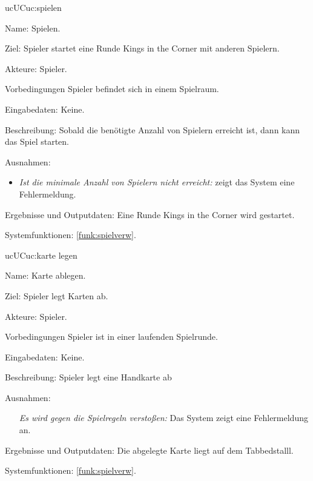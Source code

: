 \begin{description}[leftmargin=5em, style=sameline]
	\begin{lhp}{uc}{UC}{uc:spielen}
		\item [Name:] Spielen.
		\item [Ziel:] Spieler startet eine Runde Kings in the Corner mit anderen Spielern.
		\item [Akteure:] Spieler.
		\item [Vorbedingungen] Spieler befindet sich in einem Spielraum.
		\item [Eingabedaten:] Keine.
		\item [Beschreibung:] Sobald die benötigte Anzahl von Spielern erreicht ist, dann kann das Spiel starten. 
		\item [Ausnahmen:] \hfill
		\begin{itemize} 
			\item \textit{ Ist die minimale Anzahl von Spielern nicht erreicht:} zeigt das System eine Fehlermeldung.
		\end{itemize}
		\item [Ergebnisse und Outputdaten:] Eine Runde Kings in the Corner wird gestartet.  
		\item [Systemfunktionen:] \ref{funk:spielverw}.
	\end{lhp}

	\begin{lhp}{uc}{UC}{uc:karte legen}
		\item [Name:] Karte ablegen.
		\item [Ziel:] Spieler legt Karten ab.
		\item [Akteure:] Spieler.
		\item [Vorbedingungen] Spieler ist in einer laufenden Spielrunde.
		\item [Eingabedaten:] Keine.
		\item [Beschreibung:] Spieler legt eine Handkarte ab
		\item [Ausnahmen:] \hfill
		\begin{itemize} 
			\item[] \textit{Es wird gegen die Spielregeln verstoßen:} Das System zeigt eine Fehlermeldung an.
			
		\end{itemize}
		\item [Ergebnisse und Outputdaten:] Die abgelegte Karte liegt auf dem Tabbedstalll.
		\item [Systemfunktionen:] \ref{funk:spielverw}.
	\end{lhp}


\end{description}
